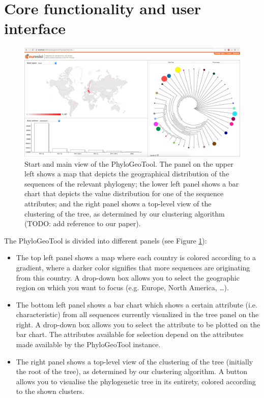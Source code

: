\documentclass[a4paper, 11pt]{article} %
\begin{document}
\section{Core functionality and user interface}
\begin{figure}[H]
\centering
\includegraphics[scale=0.1875]{images/defaultScreenshot.png}
\vspace{-0.75cm}
\caption{Start and main view of the PhyloGeoTool. 
The panel on the upper left shows a map that depicts the geographical distribution of the sequences of the relevant phylogeny; the lower left panel shows a bar chart that depicts the value distribution for one of the sequence attributes; and the right panel shows a top-level view of the clustering of the tree, as determined by our clustering algorithm (TODO: add reference to our paper).}
\label{fig:initialview}
\end{figure}

The PhyloGeoTool is divided into different panels (see Figure \ref{fig:initialview}): 
\begin{itemize}
  \item The top left panel shows a map where each country is colored according to a gradient, where a darker color signifies that more sequences are originating from this country. 
  A drop-down box allows you to select the geographic region on which you want to focus (e.g. Europe, North America, \ldots).
  \item The bottom left panel shows a bar chart which shows a certain attribute (i.e. characteristic) from all sequences currently visualized in the tree panel on the right. 
  A drop-down box allows you to select the attribute to be plotted on the bar chart. 
  The attributes available for selection depend on the attributes made available by the PhyloGeoTool instance.
  \item The right panel shows a top-level view of the clustering of the tree (initially the root of the tree), as determined by our clustering algorithm. %
  A button allows you to visualise the phylogenetic tree in its entirety, colored according to the shown clusters.
\end{itemize}
\end{document}
